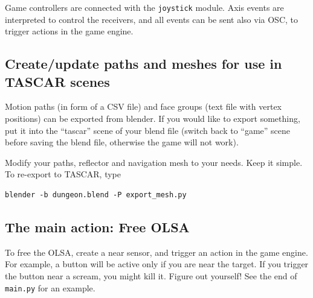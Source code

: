 \documentclass[11pt,a4paper,twoside]{article}
\begin{document}
Game controllers are connected with the \verb!joystick! module. Axis
events are interpreted to control the receivers, and all events can be
sent also via OSC, to trigger actions in the game engine.

\subsection*{Create/update paths and meshes for use in TASCAR scenes}

Motion paths (in form of a CSV file) and face groups (text file with
vertex positions) can be exported from blender. If you would like to
export something, put it into the ``tascar'' scene of your blend file
(switch back to ``game'' scene before saving the blend file, otherwise
the game will not work).

Modify your paths, reflector and navigation mesh to your needs. Keep
it simple. To re-export to TASCAR, type
\begin{verbatim}
blender -b dungeon.blend -P export_mesh.py
\end{verbatim}


\subsection*{The main action: Free OLSA}

To free the OLSA, create a near sensor, and trigger an action in the
game engine. For example, a button will be active only if you are near
the target. If you trigger the button near a scream, you might kill
it. Figure out yourself! See the end of \verb!main.py! for an example.

\fi
\end{document}
